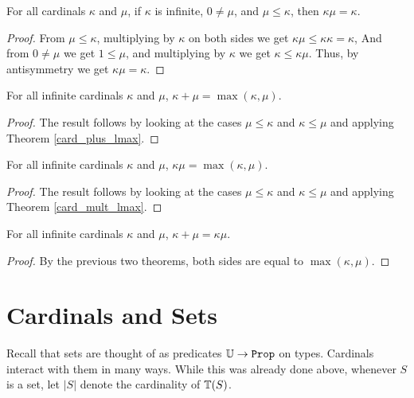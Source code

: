 \documentclass[../../math.tex]{subfiles}
\begin{document}
\begin{theorem} \label{card_mult_lmax}
    For all cardinals $\kappa$ and $\mu$, if $\kappa$ is infinite, $0 \neq \mu$,
    and $\mu \leq \kappa$, then $\kappa \mu = \kappa$.
\end{theorem}
\begin{proof}
    From $\mu \leq \kappa$, multiplying by $\kappa$ on both sides we get $\kappa
    \mu \leq \kappa \kappa = \kappa$,  And from $0 \neq \mu$ we get $1 \leq
    \mu$, and multiplying by $\kappa$ we get $\kappa \leq \kappa \mu$.  Thus, by
    antisymmetry we get $\kappa \mu = \kappa$.
\end{proof}

\begin{theorem} \label{card_plus_max}
    For all infinite cardinals $\kappa$ and $\mu$, $\kappa + \mu = \max(\kappa,
    \mu)$.
\end{theorem}
\begin{proof}
    The result follows by looking at the cases $\mu \leq \kappa$ and $\kappa
    \leq \mu$ and applying Theorem \ref{card_plus_lmax}.
\end{proof}

\begin{theorem} \label{card_mult_max}
    For all infinite cardinals $\kappa$ and $\mu$, $\kappa \mu = \max(\kappa,
    \mu)$.
\end{theorem}
\begin{proof}
    The result follows by looking at the cases $\mu \leq \kappa$ and $\kappa
    \leq \mu$ and applying Theorem \ref{card_mult_lmax}.
\end{proof}

\begin{theorem} \label{card_inf_plus_mult}
    For all infinite cardinals $\kappa$ and $\mu$, $\kappa + \mu = \kappa\mu$.
\end{theorem}
\begin{proof}
    By the previous two theorems, both sides are equal to $\max(\kappa, \mu)$.
\end{proof}

\section{Cardinals and Sets}

Recall that sets are thought of as predicates $\U \to \Prop$ on types.
Cardinals interact with them in many ways.  While this was already done above,
whenever $S$ is a set, let $|S|$ denote the cardinality of $\mathbb{T}(S)$.
\end{document}
